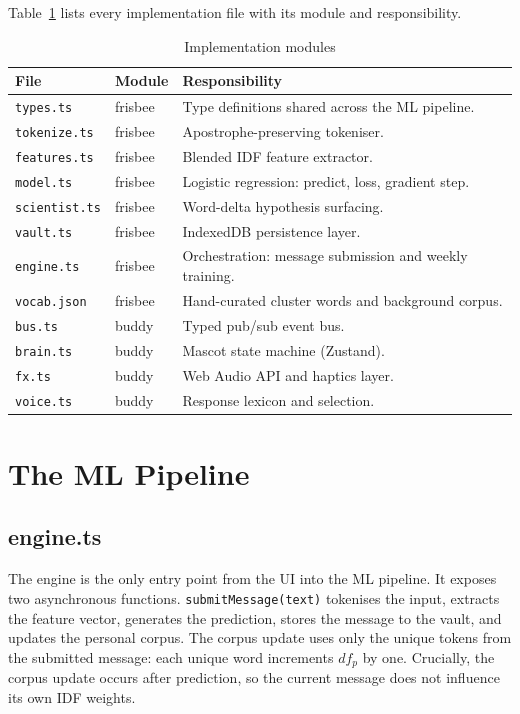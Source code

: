 \documentclass[11pt, a4paper]{report}
\begin{document}
Table~\ref{tab:modules} lists every implementation file with its module
and responsibility.

\begin{table}[H]
\centering
\caption{Implementation modules}
\label{tab:modules}
\begin{tabularx}{\textwidth}{@{} p{2.6cm} p{2.0cm} X @{}}
\toprule
\textbf{File} & \textbf{Module} & \textbf{Responsibility} \\
\midrule
\texttt{types.ts}      & frisbee & Type definitions shared across the ML pipeline. \\
\texttt{tokenize.ts}   & frisbee & Apostrophe-preserving tokeniser. \\
\texttt{features.ts}   & frisbee & Blended IDF feature extractor. \\
\texttt{model.ts}      & frisbee & Logistic regression: predict, loss, gradient step. \\
\texttt{scientist.ts}  & frisbee & Word-delta hypothesis surfacing. \\
\texttt{vault.ts}      & frisbee & IndexedDB persistence layer. \\
\texttt{engine.ts}     & frisbee & Orchestration: message submission and weekly training. \\
\texttt{vocab.json}    & frisbee & Hand-curated cluster words and background corpus. \\
\midrule
\texttt{bus.ts}        & buddy  & Typed pub/sub event bus. \\
\texttt{brain.ts}      & buddy  & Mascot state machine (Zustand). \\
\texttt{fx.ts}         & buddy  & Web Audio API and haptics layer. \\
\texttt{voice.ts}      & buddy  & Response lexicon and selection. \\
\bottomrule
\end{tabularx}
\end{table}

\section{The ML Pipeline}

\subsection{engine.ts}

The engine is the only entry point from the UI into the ML pipeline. It
exposes two asynchronous functions. \texttt{submitMessage(text)} tokenises
the input, extracts the feature vector, generates the prediction, stores
the message to the vault, and updates the personal corpus. The corpus
update uses only the unique tokens from the submitted message: each unique
word increments $df_p$ by one. Crucially, the corpus update occurs after
prediction, so the current message does not influence its own IDF weights.
\end{document}

